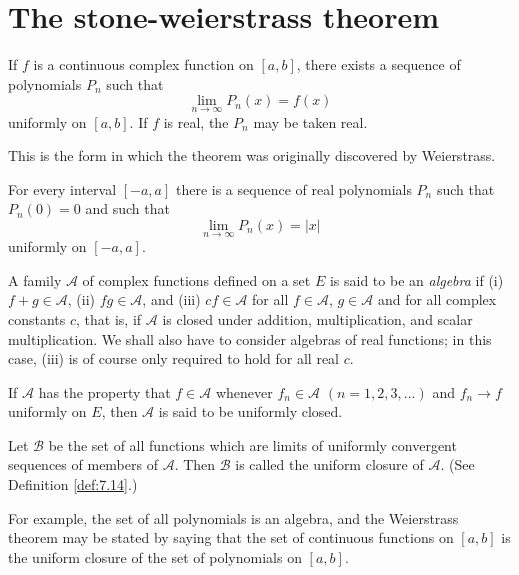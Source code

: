 \section{The stone-weierstrass theorem}

\begin{thm}
    \label{thm:7.26}
    If $f$ is a continuous complex function on $[a, b]$, 
    there exists a sequence of polynomials $P_n$ such that
    \begin{equation*}
        \lim_{n \to \infty} P_n(x) = f(x)        
    \end{equation*}
    uniformly on $[a, b]$. 
    If $f$ is real, the $P_n$ may be taken real.
\end{thm}

This is the form in which the theorem was originally discovered by
Weierstrass.


\begin{myCorollary}
    \label{myCorollary:7.27}
    For every interval $[-a, a]$ 
    there is a sequence of real polynomials $P_n$ such that $P_n(0) = 0$
    and such that
    \begin{equation*}
        \lim_{n \to \infty} P_n(x) = \left| x \right| 
    \end{equation*}
    uniformly on $[-a, a]$.
\end{myCorollary}


\begin{mydef}
    \label{def:7.28}
    A family $\mathscr{A}$ of complex functions defined on a set $E$
    is said to be an \emph{algebra} if 
    (i) $f + g \in \mathscr{A}$, 
    (ii) $fg \in \mathscr{A}$, and 
    (iii) $cf \in \mathscr{A}$ 
    for all $f \in \mathscr{A}$, $g \in \mathscr{A}$
    and for all complex constants $c$, 
    that is, if $\mathscr{A}$ is closed under addition, multiplication, and scalar multiplication. 
    We shall also have to consider algebras of real functions; 
    in this case, (iii) is of course only required to hold for all real $c$.
    
    If $\mathscr{A}$ has the property that $f \in \mathscr{A}$ whenever $f_n \in \mathscr{A}$ $(n = 1, 2, 3, ... )$ and
    $f_n \rightarrow f$ uniformly on $E$, 
    then $\mathscr{A}$ is said to be uniformly closed.
    
    Let $\mathscr{B}$ be the set of all functions which are limits of uniformly convergent sequences of members of $\mathscr{A}$. 
    Then $\mathscr{B}$ is called the uniform closure of $\mathscr{A}$. 
    (See Definition \ref{def:7.14}.)
    
    For example, the set of all polynomials is an algebra, and the Weierstrass theorem may be stated by saying that the set of continuous functions on $[a, b]$ is the uniform closure of the set of polynomials on $[a, b]$.
\end{mydef}

